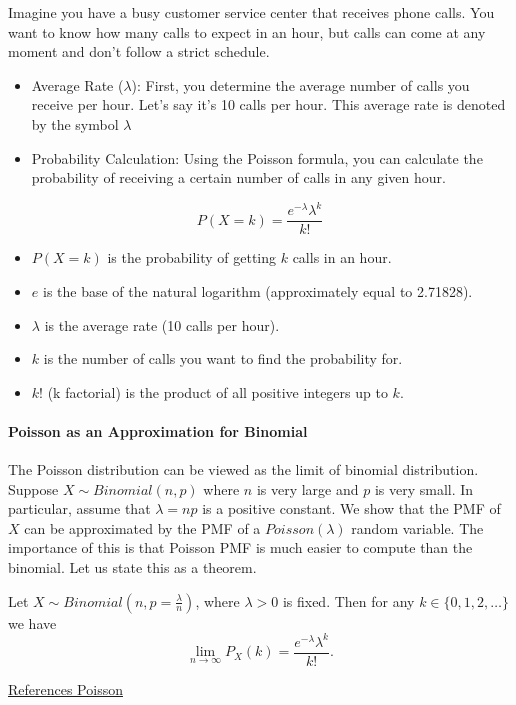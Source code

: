 Imagine you have a busy customer service center that receives phone calls. You want to know how many calls to expect in an hour, but calls can come at any moment and don't follow a strict schedule. 
\begin{itemize}
	\item Average Rate ($\lambda$): First, you determine the average number of calls you receive per hour. Let's say it’s 10 calls per hour. This average rate is denoted by the symbol $\lambda$ 
	\item Probability Calculation: Using the Poisson formula, you can calculate the probability of receiving a certain number of calls in any given hour.
\end{itemize}
\[
P(X = k) = \frac{e^{-λ} λ^k}{k!}
\]
\begin{itemize}
	\item \( P(X = k) \) is the probability of getting \( k \) calls in an hour.
	\item \( e \) is the base of the natural logarithm (approximately equal to 2.71828).
	\item \( \lambda \) is the average rate (10 calls per hour).
	\item \( k \) is the number of calls you want to find the probability for.
	\item \( k! \) (k factorial) is the product of all positive integers up to \( k \).
\end{itemize}


\paragraph{Poisson as an Approximation for Binomial}
 
The Poisson distribution can be viewed as the limit of binomial distribution. Suppose $X\sim Binomial(n,p)$ where $n$ is very large and $p$ is very small. In particular, assume that $\lambda=np$ is a positive constant. We show that the PMF of $X$ can be approximated by the PMF of a $Poisson(\lambda)$ random variable. The importance of this is that Poisson PMF is much easier to compute than the binomial. Let us state this as a theorem.

Let $X\sim Binomial(n,p=\frac{\lambda}{n})$, where $\lambda>0$ is fixed. Then for any $k\in\{0,1,2,\dots\}$ we have 
$$\lim_{n\to \infty}P_X(k) = \frac{e^{-λ} λ^k}{k!}.$$

\href{https://www.probabilitycourse.com/chapter3/3_1_5_special_discrete_distr.php}{References Poisson}

